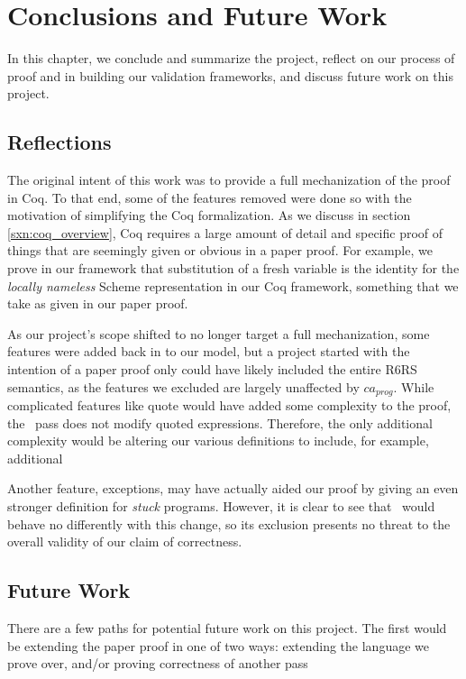 \chapter{Conclusions and Future Work}
In this chapter, we conclude and summarize the project, reflect on our process of proof and in building our validation frameworks, and discuss future work on this project.

\section{Reflections}
The original intent of this work was to provide a full mechanization of the proof in Coq. To that end, some of the features removed were done so with the motivation of simplifying the Coq formalization. As we discuss in section \ref{sxn:coq_overview}, Coq requires a large amount of detail and specific proof of things that are seemingly given or obvious in a paper proof. For example, we prove in our framework that substitution of a fresh variable is the identity for the \textit{locally nameless} Scheme representation in our Coq framework, something that we take as given in our paper proof.

As our project's scope shifted to no longer target a full mechanization, some features were added back in to our model, but a project started with the intention of a paper proof only could have likely included the entire R6RS semantics, as the features we excluded are largely unaffected by $ca_{prog}$. While complicated features like quote would have added some complexity to the proof, the \caname\ pass does not modify quoted expressions. Therefore, the only additional complexity would be altering our various definitions to include, for example, additional 

Another feature, exceptions, may have actually aided our proof by giving an even stronger definition for \textit{stuck} programs. However, it is clear to see that \caname\ would behave no differently with this change, so its exclusion presents no threat to the overall validity of our claim of correctness.

\section{Future Work}
There are a few paths for potential future work on this project. The first would be extending the paper proof in one of two ways: extending the language we prove over, and/or proving correctness of another pass 

